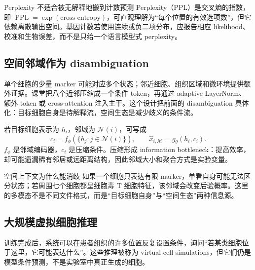 \begin{warningbox}{Perplexity 不适合被无解释地搬到计数预测}
Perplexity（PPL）是交叉熵的指数，即 $\operatorname{PPL}=\exp(\text{cross-entropy})$，可直观理解为“每个位置的有效选项数”，但它依赖离散输出空间。基因计数若使用连续或负二项分布，应报告相应 likelihood、校准和生物误差，而不是只给一个语言模型式 perplexity。
\end{warningbox}

\subsection{空间邻域作为 disambiguation}

单个细胞的少量 marker 可能对应多个状态；邻近细胞、组织区域和微环境提供额外证据。课堂把八个近邻压缩成一个条件 token，再通过 adaptive LayerNorm、额外 token 或 cross-attention 注入主干。这个设计把前面的 disambiguation 具体化：目标细胞自身是待解释流，空间生态是减少歧义的条件流。


若目标细胞表示为 $h_i$，邻域为 $\mathcal{N}(i)$，可写成
\[
c_i=f_\phi\!\left(\{h_j:j\in\mathcal{N}(i)\}\right),\qquad
\hat{x}_{i,\mathcal M}=g_\theta(h_i,c_i).
\]
$f_\phi$ 是邻域编码器，$c_i$ 是压缩条件。压缩形成 information bottleneck：提高效率，却可能遗漏稀有邻居或远距离结构，因此邻域大小和聚合方式是实验变量。


\begin{importantbox}{空间上下文为什么能消歧}
如果一个细胞只表达有限 marker，单看自身可能无法区分状态；若周围七个细胞都呈细胞毒 T 细胞特征，该邻域会改变后验概率。这里的多模态不是不同文件格式，而是“目标细胞自身”与“空间生态”两种信息源。
\end{importantbox}

\subsection{大规模虚拟细胞推理}

训练完成后，系统可以在患者组织的许多位置反复设置条件，询问“若某类细胞位于这里，它可能表达什么”。这些推理被称为 virtual cell simulations，但它们仍是模型条件预测，不是实验室中真正生成的细胞。


